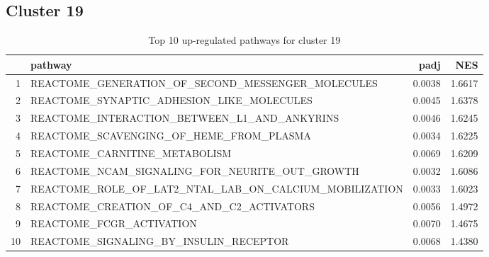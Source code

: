 \documentclass{article}
\begin{document}
\subsection{Cluster 19 }
\begin{table}[H]
\centering
\begin{tabularx}{\textwidth}{rlrr}
  \hline
 & pathway & padj & NES \\ 
  \hline
1 & REACTOME\_GENERATION\_OF\_SECOND\_MESSENGER\_MOLECULES & 0.0038 & 1.6617 \\ 
  2 & REACTOME\_SYNAPTIC\_ADHESION\_LIKE\_MOLECULES & 0.0045 & 1.6378 \\ 
  3 & REACTOME\_INTERACTION\_BETWEEN\_L1\_AND\_ANKYRINS & 0.0046 & 1.6245 \\ 
  4 & REACTOME\_SCAVENGING\_OF\_HEME\_FROM\_PLASMA & 0.0034 & 1.6225 \\ 
  5 & REACTOME\_CARNITINE\_METABOLISM & 0.0069 & 1.6209 \\ 
  6 & REACTOME\_NCAM\_SIGNALING\_FOR\_NEURITE\_OUT\_GROWTH & 0.0032 & 1.6086 \\ 
  7 & REACTOME\_ROLE\_OF\_LAT2\_NTAL\_LAB\_ON\_CALCIUM\_MOBILIZATION & 0.0033 & 1.6023 \\ 
  8 & REACTOME\_CREATION\_OF\_C4\_AND\_C2\_ACTIVATORS & 0.0056 & 1.4972 \\ 
  9 & REACTOME\_FCGR\_ACTIVATION & 0.0070 & 1.4675 \\ 
  10 & REACTOME\_SIGNALING\_BY\_INSULIN\_RECEPTOR & 0.0068 & 1.4380 \\ 
   \hline
\end{tabularx}
\caption{Top 10 up-regulated pathways for cluster 19} 
\label{tab:q3_2_19}
\end{table}
\end{document}
